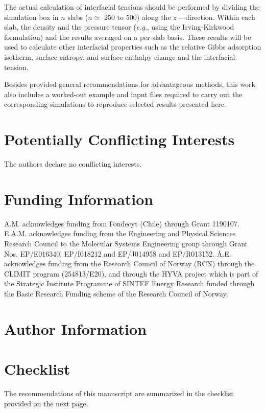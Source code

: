 \documentclass[9pt,tutorial]{livecoms}
\begin{document}
The actual calculation of interfacial tensions should be performed by dividing
the simulation box in $n$ slabs ($n{\simeq}$ 250 to 500) along
the $z-$direction. Within each slab, the density and the pressure tensor
(\textit{e.g}., using the Irving-Kirkwood formulation) and the results averaged
on a per-slab basis. These results will be used to calculate other interfacial
properties such as the relative Gibbs adsorption isotherm, surface entropy, and
surface enthalpy change and the interfacial tension.

Besides provided general recommendations for advantageous methods, this work also includes a worked-out
example and input files required to carry out the corresponding simulations to
reproduce selected results presented here.

\section*{Potentially Conflicting Interests}
The authors declare no conflicting interests.

\section*{Funding Information}
A.M. acknowledges funding from Fondecyt (Chile) through Grant 1190107. E.A.M.
acknowledges funding from the Engineering and Physical Sciences Research
Council to the Molecular Systems Engineering group through Grant Nos.
EP/E016340, EP/I018212 and EP/J014958 and EP/R013152.
\AA{}.E. acknowledges funding from the Research Council of Norway (RCN) 
through the CLIMIT program (254813/E20), and through the HYVA project which 
is part of the Strategic Institute Programme of SINTEF Energy Research funded 
through the Basic Research Funding scheme of the Research Council of Norway.

\section*{Author Information}
\makeorcid

\appendix
\section{Checklist}
\label{checklist}
The recommendations of this manuscript are summarized in the checklist provided on the next page.
\end{document}
